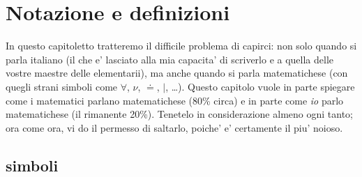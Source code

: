 \label{notazione}
\chapter{Notazione e definizioni}


In questo capitoletto tratteremo il difficile problema di capirci: non solo quando si parla italiano (il che e' lasciato
alla mia capacita' di scriverlo e a quella delle vostre maestre delle elementarii), ma anche quando si parla matematichese
(con quegli strani simboli come $\forall$, $\nu$, $\doteq$, $|$, \ldots). Questo capitolo vuole in parte spiegare come i
matematici parlano matematichese (80\% circa) e in parte come {\em io} parlo matematichese (il rimanente 20\%).
Tenetelo in considerazione almeno ogni tanto; ora come ora, vi do il permesso di saltarlo, poiche' e' certamente il piu' noioso.

\section{simboli}

